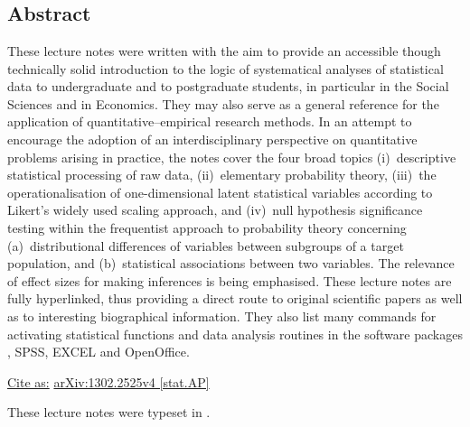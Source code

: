 \chapter*{}
\vspace{-8ex}
\section*{Abstract}
{\small These lecture notes were written with the aim to provide 
an accessible though technically solid introduction to the logic 
of systematical analyses of statistical data to undergraduate 
and to postgraduate students, in particular in the Social Sciences 
and in Economics. They may also serve as a general reference for 
the application of quantitative--empirical research methods. In an 
attempt to encourage the adoption of an interdisciplinary 
perspective on quantitative problems arising in practice, the 
notes cover the four broad topics (i)~descriptive statistical 
processing of raw data, (ii)~elementary probability theory,
(iii)~the operationalisation of one-dimensional latent statistical
variables according to Likert's widely used scaling approach, and
(iv)~null hypothesis significance testing within the
frequentist approach to probability theory concerning 
(a)~distributional differences of variables between subgroups of a 
target population, and (b)~statistical associations between two 
variables. The relevance of effect sizes for making inferences is
being emphasised. These lecture notes are fully hyperlinked, thus
providing a direct route to original scientific papers as well as
to interesting biographical information. They also list many
commands for activating statistical functions and data analysis
routines in  the software packages \R{}, SPSS, EXCEL and
OpenOffice.}

\vspace{10mm}
\noindent
\underline{Cite as:} 
\href{http://arxiv.org/abs/1302.2525}{arXiv:1302.2525v4 [stat.AP]}
\vfill

\medskip
\noindent
These lecture notes were typeset in \LaTeXe.

